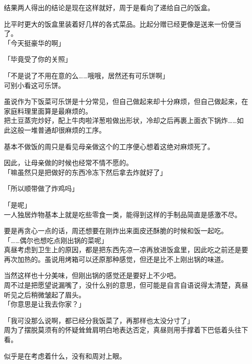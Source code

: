 结果两人得出的结论是现在这样就好，周于是看向了递给自己的饭盒。

比平时更大的饭盒里装着好几样的各式菜品。比起分赠已经更像是送来一份便当了。\\

「今天挺豪华的啊」

「毕竟受了你的关照」

「不是说了不用在意的么……哦哦，居然还有可乐饼啊」\\

可别小看这可乐饼。

虽说作为下饭菜可乐饼是十分常见，但自己做起来却十分麻烦，但自己做起来，在家庭料理里面算是最麻烦的。\\

把土豆蒸完炒好，配上牛肉啦洋葱啦做出形状，冷却之后再裹上面衣下锅炸……如此这般一堆普通却很麻烦的工序。

基本不做饭的周只是看见母亲做这个的工序便心想着这绝对麻烦死了。

因此，让母亲做的时候也经常不情不愿的。\\

「嘛虽然只是把做好的东西冷冻下然后拿去炸就好了」

「所以顺带做了炸鸡吗」

「是呢」\\

一人独居炸物基本上就是吃些零食一类，能得到这样的手制品简直是感激不尽。

要是再贪心一点的话，周还想要在刚炸出来面皮还酥脆的时候和饭一起吃。\\

「……偶尔也想吃点刚出锅的菜呢」\\

真昼考虑到卫生上的原因，都是把东西先凉一凉再放进饭盒里，因此吃之前还是要再次加热的。虽说用烤箱可以还原那种感觉，但还是比不上刚出锅的味道。

当然这样也十分美味，但刚出锅的感觉还是要好上不少吧。\\

周不过是把愿望说漏嘴了，没什么别的意思，但可能是自言自语说得太清楚，真昼听见之后稍微皱起了眉头。\\

「你意思是让我去你家？」

「我可没那么说啊，都已经分我饭菜了，再那样也太没分寸了」\\

周为了摆脱莫须有的怀疑耸耸肩明白地表达否定，真昼则用手撑着下巴低着头往下看。

似乎是在考虑着什么，没有和周对上眼。\\


